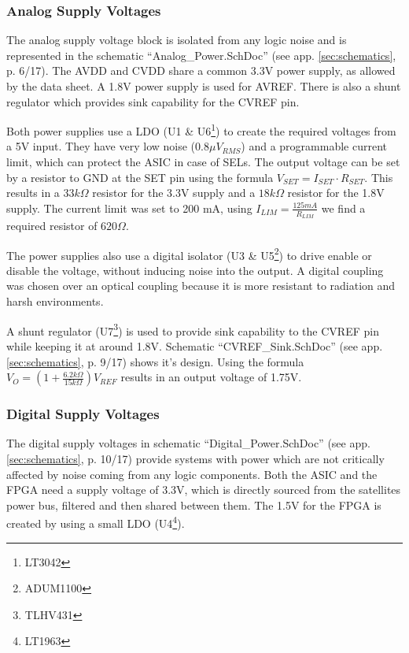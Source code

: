 \subsubsection{Analog Supply Voltages}
\label{sec:analog_supply}
The analog supply voltage block is isolated from any logic noise and is represented in the schematic ``Analog\_Power.SchDoc'' (see app. \ref{sec:schematics}, p. 6/17).
The AVDD and CVDD share a common 3.3V power supply, as allowed by the data sheet.
A 1.8V power supply is used for AVREF.
There is also a shunt regulator which provides sink capability for the CVREF pin.

Both power supplies use a LDO (U1 \& U6\footnote{LT3042}) to create the required voltages from a 5V input.
They have very low noise ($0.8 \mu V_{RMS}$) and a programmable current limit, which can protect the ASIC in case of SELs.
The output voltage can be set by a resistor to GND at the SET pin using the formula $V_{SET} = I_{SET}\cdot R_{SET}$.
This results in a $33k\Omega$ resistor for the 3.3V supply and a $18k\Omega$ resistor for the 1.8V supply.
The current limit was set to 200 mA, using $I_{LIM} = \frac{125mA}{R_{LIM}}$ we find a required resistor of $620\Omega$.

The power supplies also use a digital isolator (U3 \& U5\footnote{ADUM1100}) to drive enable or disable the voltage, without inducing noise into the output.
A digital coupling was chosen over an optical coupling because it is more resistant to radiation and harsh environments.

A shunt regulator (U7\footnote{TLHV431}) is used to provide sink capability to the CVREF pin while keeping it at around 1.8V.
Schematic ``CVREF\_Sink.SchDoc'' (see app. \ref{sec:schematics}, p. 9/17) shows it's design.
Using the formula $V_O = (1+\frac{6.2k\Omega}{15k\Omega})V_{REF}$ results in an output voltage of 1.75V.

\subsubsection{Digital Supply Voltages}
\label{sec:digital_supply}
The digital supply voltages in schematic ``Digital\_Power.SchDoc'' (see app. \ref{sec:schematics}, p. 10/17) provide systems with power which are not critically affected by noise coming from any logic components.
Both the ASIC and the FPGA need a supply voltage of 3.3V, which is directly sourced from the satellites power bus, filtered and then shared between them.
The 1.5V for the FPGA is created by using a small LDO (U4\footnote{LT1963}).


